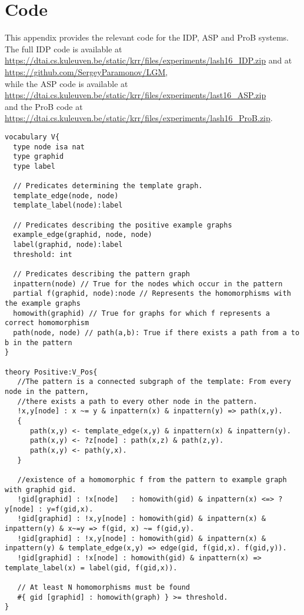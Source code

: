 \section{Code}
\label{app:Code}
This appendix provides the relevant code for the IDP, ASP and ProB systems.
The full IDP code is available at\\ \url{https://dtai.cs.kuleuven.be/static/krr/files/experiments/lash16_IDP.zip} and at \\\url{https://github.com/SergeyParamonov/LGM},\\ while the ASP code is available at\\ \url{https://dtai.cs.kuleuven.be/static/krr/files/experiments/last16_ASP.zip}\\ and the ProB code at \\\url{https://dtai.cs.kuleuven.be/static/krr/files/experiments/lash16_ProB.zip}. 
\begin{lstlisting}[caption=IDP positive constraint, style=model, label=lst:IDPPos]
vocabulary V{
  type node isa nat
  type graphid
  type label

  // Predicates determining the template graph.
  template_edge(node, node) 
  template_label(node):label

  // Predicates describing the positive example graphs
  example_edge(graphid, node, node)
  label(graphid, node):label
  threshold: int

  // Predicates describing the pattern graph
  inpattern(node) // True for the nodes which occur in the pattern
  partial f(graphid, node):node // Represents the homomorphisms with the example graphs
  homowith(graphid) // True for graphs for which f represents a correct homomorphism
  path(node, node) // path(a,b): True if there exists a path from a to b in the pattern
}

theory Positive:V_Pos{
   //The pattern is a connected subgraph of the template: From every node in the pattern, 
   //there exists a path to every other node in the pattern.
   !x,y[node] : x ~= y & inpattern(x) & inpattern(y) => path(x,y).
   {
      path(x,y) <- template_edge(x,y) & inpattern(x) & inpattern(y).
      path(x,y) <- ?z[node] : path(x,z) & path(z,y).
      path(x,y) <- path(y,x).
   }

   //existence of a homomorphic f from the pattern to example graph with graphid gid.
   !gid[graphid] : !x[node]   : homowith(gid) & inpattern(x) <=> ? y[node] : y=f(gid,x).
   !gid[graphid] : !x,y[node] : homowith(gid) & inpattern(x) & inpattern(y) & x~=y => f(gid, x) ~= f(gid,y).
   !gid[graphid] : !x,y[node] : homowith(gid) & inpattern(x) & inpattern(y) & template_edge(x,y) => edge(gid, f(gid,x). f(gid,y)).
   !gid[graphid] : !x[node] : homowith(gid) & inpattern(x) => template_label(x) = label(gid, f(gid,x)).

   // At least N homomorphisms must be found
   #{ gid [graphid] : homowith(graph) } >= threshold.
}
\end{lstlisting}


